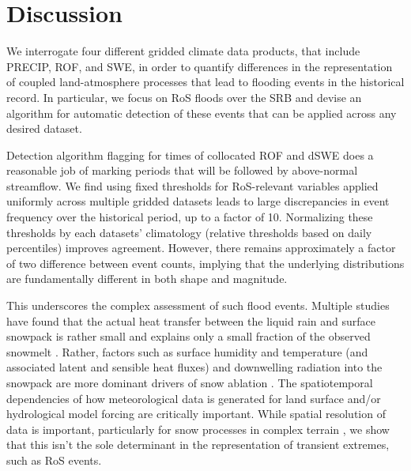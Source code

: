 \documentclass[draft]{agujournal2019}
\begin{document}
\section{Discussion}

We interrogate four different gridded climate data products, that include PRECIP, ROF, and SWE, in order to quantify differences in the representation of coupled land-atmosphere processes that lead to flooding events in the historical record.
In particular, we focus on RoS floods over the SRB and devise an algorithm for automatic detection of these events that can be applied across any desired dataset. 

Detection algorithm flagging for times of collocated ROF and dSWE does a reasonable job of marking periods that will be followed by above-normal streamflow. 
We find using fixed thresholds for RoS-relevant variables applied uniformly across multiple gridded datasets leads to large discrepancies in event frequency over the historical period, up to a factor of 10. 
Normalizing these thresholds by each datasets' climatology (relative thresholds based on daily percentiles) improves agreement. 
However, there remains approximately a factor of two difference between event counts, implying that the underlying distributions are fundamentally different in both shape and magnitude.




This underscores the complex assessment of such flood events. Multiple studies have found that the actual heat transfer between the liquid rain and surface snowpack is rather small and explains only a small fraction of the observed snowmelt \citep{moore1984controls}. 
Rather, factors such as surface humidity and temperature (and associated latent and sensible heat fluxes) and downwelling radiation into the snowpack are more dominant drivers of snow ablation \citep{mazurkiewicz2008assessing,wurzer2016influence,harpold2018humidity}. The spatiotemporal dependencies of how meteorological data is generated for land surface and/or hydrological model forcing are critically important. 
While spatial resolution of data is important, particularly for snow processes in complex terrain \citep{henn2018an,Woodburn2021}, we show that this isn't the sole determinant in the representation of transient extremes, such as RoS events.
\end{document}
